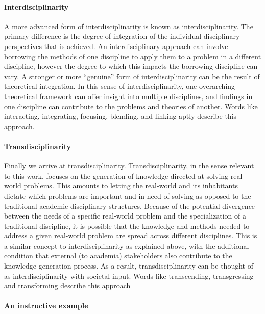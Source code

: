 \documentclass[a4paper]{article}
\begin{document}
\paragraph{Interdisciplinarity}

A more advanced form of interdisciplinarity is known as interdisciplinarity.
The primary difference is the degree of integration of the individual
disciplinary perspectives that is achieved. An interdisciplinary approach can
involve borrowing the methods of one discipline to apply them to a problem in
a different discipline, however the degree to which this impacts the borrowing
discipline can vary. A stronger or more ``genuine'' form of
interdisciplinarity can be the result of theoretical integration. In this
sense of interdisciplinarity, one overarching theoretical framework can offer
insight into multiple disciplines, and findings in one discipline can
contribute to the problems and theories of another. Words like interacting,
integrating, focusing, blending, and linking aptly describe this approach. 

\paragraph{Transdisciplinarity}

Finally we arrive at transdisciplinarity. Transdisciplinarity, in the sense
relevant to this work, focuses on the generation of knowledge directed at
solving real-world problems. This amounts to letting the real-world and its
inhabitants dictate which problems are important and in need of solving as
opposed to the traditional academic disciplinary structures. Because of the
potential divergence between the needs of a specific real-world problem and
the specialization of a traditional discipline, it is possible that the
knowledge and methods needed to address a given real-world problem are spread
across different disciplines. This is a similar concept to
interdisciplinarity as explained above, with the additional condition that
external (to academia) stakeholders also contribute to the knowledge
generation process. As a result, transdisciplinarity can be thought of as
interdisciplinarity with societal input. Words like transcending,
transgressing and transforming describe this approach

\paragraph{An instructive example}
\end{document}
